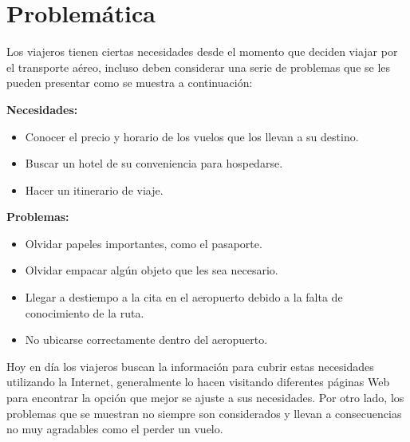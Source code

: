 \section{Problemática}

Los viajeros tienen ciertas necesidades desde el momento que deciden viajar por el transporte aéreo, incluso deben considerar una serie de problemas que se les pueden presentar como se muestra a continuación:

\textbf{Necesidades:}

\begin{itemize}
	\item Conocer el precio y horario de los vuelos que los llevan a su destino.
	\item Buscar un hotel de su conveniencia para hospedarse.
	\item Hacer un itinerario de viaje.
\end{itemize}

\textbf{Problemas:}

\begin{itemize}
	\item Olvidar papeles importantes, como el pasaporte.
	\item Olvidar empacar algún objeto que les sea necesario.
	\item Llegar a destiempo a la cita en el aeropuerto debido a la falta de conocimiento de la ruta.
	\item No ubicarse correctamente dentro del aeropuerto.
\end{itemize}

Hoy en día los viajeros buscan la información para cubrir estas necesidades utilizando la Internet,  generalmente lo hacen visitando diferentes páginas Web para encontrar la opción que mejor se ajuste a sus necesidades. Por otro lado, los problemas que se muestran no siempre son considerados y llevan a consecuencias no muy agradables como el perder un vuelo.